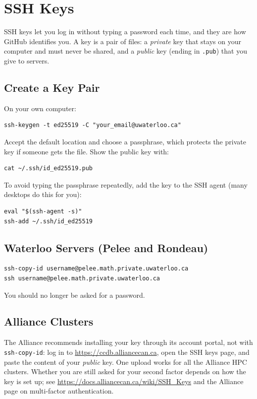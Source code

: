 \section{SSH Keys}
\label{app:ssh}

SSH keys let you log in without typing a password each time, and they are how GitHub identifies
you. A key is a pair of files: a \emph{private} key that stays on your computer and must never be
shared, and a \emph{public} key (ending in \texttt{.pub}) that you give to servers.

\subsection{Create a Key Pair}

On your own computer:

\begin{lstlisting}
ssh-keygen -t ed25519 -C "your_email@uwaterloo.ca"
\end{lstlisting}

Accept the default location and choose a passphrase, which protects the private key if someone gets
the file. Show the public key with:

\begin{lstlisting}
cat ~/.ssh/id_ed25519.pub
\end{lstlisting}

To avoid typing the passphrase repeatedly, add the key to the SSH agent (many desktops do this for
you):

\begin{lstlisting}
eval "$(ssh-agent -s)"
ssh-add ~/.ssh/id_ed25519
\end{lstlisting}

\subsection{Waterloo Servers (Pelee and Rondeau)}

\begin{lstlisting}
ssh-copy-id username@pelee.math.private.uwaterloo.ca
ssh username@pelee.math.private.uwaterloo.ca
\end{lstlisting}

You should no longer be asked for a password.

\subsection{Alliance Clusters}

The Alliance recommends installing your key through its account portal, not with
\texttt{ssh-copy-id}: log in to \url{https://ccdb.alliancecan.ca}, open the SSH keys page, and
paste the content of your \emph{public} key. One upload works for all the Alliance HPC clusters.
Whether you are still asked for your second factor depends on how the key is set up; see
\url{https://docs.alliancecan.ca/wiki/SSH_Keys} and the Alliance page on multi-factor
authentication.

